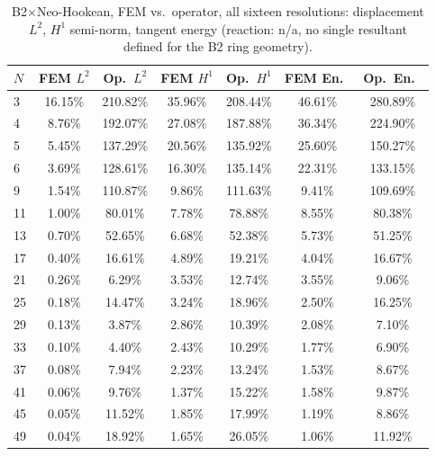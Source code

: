 \documentclass[final,5p,times]{elsarticle}
\begin{document}
\begin{table}[ht]
\centering
\caption{B2$\times$Neo-Hookean, FEM vs.\ operator, all sixteen
  resolutions: displacement $L^2$, $H^1$ semi-norm, tangent energy
  (reaction: n/a, no single resultant defined for the B2 ring
  geometry).}
\label{tab:b1-b2nh-a}
\scriptsize
\begin{tabular}{lcccccc}
\toprule
$N$ & FEM $L^2$ & Op.\ $L^2$ & FEM $H^1$ & Op.\ $H^1$ & FEM En.\ & Op.\ En.\ \\
\midrule
3  & 16.15\% & 210.82\% & 35.96\% & 208.44\% & 46.61\% & 280.89\% \\
4  & 8.76\%  & 192.07\% & 27.08\% & 187.88\% & 36.34\% & 224.90\% \\
5  & 5.45\%  & 137.29\% & 20.56\% & 135.92\% & 25.60\% & 150.27\% \\
6  & 3.69\%  & 128.61\% & 16.30\% & 135.14\% & 22.31\% & 133.15\% \\
9  & 1.54\%  & 110.87\% & 9.86\%  & 111.63\% & 9.41\%  & 109.69\% \\
11 & 1.00\%  & 80.01\%  & 7.78\%  & 78.88\%  & 8.55\%  & 80.38\%  \\
13 & 0.70\%  & 52.65\%  & 6.68\%  & 52.38\%  & 5.73\%  & 51.25\%  \\
17 & 0.40\%  & 16.61\%  & 4.89\%  & 19.21\%  & 4.04\%  & 16.67\%  \\
21 & 0.26\%  & 6.29\%   & 3.53\%  & 12.74\%  & 3.55\%  & 9.06\%   \\
25 & 0.18\%  & 14.47\%  & 3.24\%  & 18.96\%  & 2.50\%  & 16.25\%  \\
29 & 0.13\%  & 3.87\%   & 2.86\%  & 10.39\%  & 2.08\%  & 7.10\%   \\
33 & 0.10\%  & 4.40\%   & 2.43\%  & 10.29\%  & 1.77\%  & 6.90\%   \\
37 & 0.08\%  & 7.94\%   & 2.23\%  & 13.24\%  & 1.53\%  & 8.67\%   \\
41 & 0.06\%  & 9.76\%   & 1.37\%  & 15.22\%  & 1.58\%  & 9.87\%   \\
45 & 0.05\%  & 11.52\%  & 1.85\%  & 17.99\%  & 1.19\%  & 8.86\%   \\
49 & 0.04\%  & 18.92\%  & 1.65\%  & 26.05\%  & 1.06\%  & 11.92\%  \\
\bottomrule
\end{tabular}
\end{table}
\end{document}
